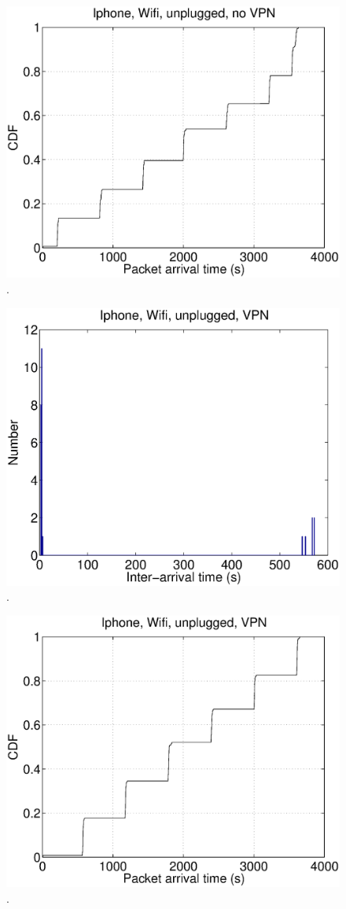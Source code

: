\begin{figure}
\centering
        \includegraphics[width=0.8\linewidth]{../../code/pushNotification/Fig/bw_iphone_wifi_unplug_novpn_ts.eps}
  \caption{.}
  \label{fig:}
\end{figure}

\begin{figure}
\centering
        \includegraphics[width=0.8\linewidth]{../../code/pushNotification/Fig/bw_iphone_wifi_unplug_vpn_interTs.eps}
  \caption{.}
  \label{fig:}
\end{figure}

\begin{figure}
\centering
        \includegraphics[width=0.8\linewidth]{../../code/pushNotification/Fig/bw_iphone_wifi_unplug_vpn_ts.eps}
  \caption{.}
  \label{fig:}
\end{figure}



